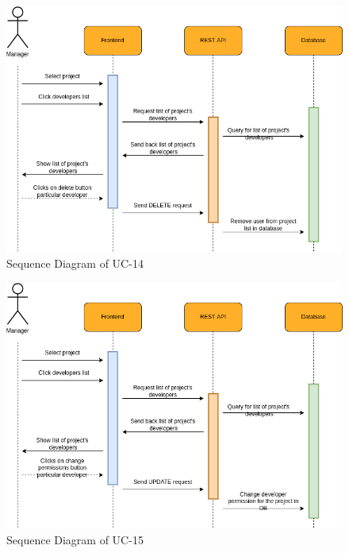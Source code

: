\begin{figure}[H]
    \centering
    \includegraphics[scale=0.5]{./diagrams/sequence/seq-14.png}
    \caption{Sequence Diagram of UC-14}
    \label{fig:seq-14}
    
\end{figure}


\begin{figure}[H]
    \centering
    \includegraphics[scale=0.5]{./diagrams/sequence/seq-15.png}
    \caption{Sequence Diagram of UC-15}
    \label{fig:seq-15}
    
\end{figure}


